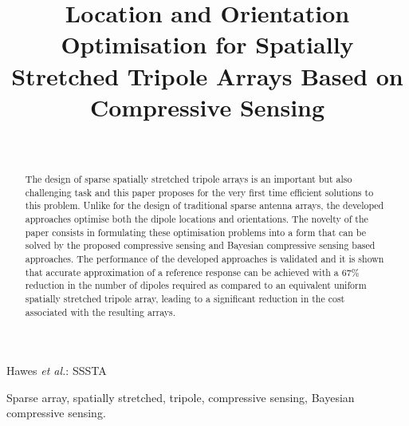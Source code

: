 \documentclass[10pt,final]{IEEEtran}
\begin{document}
%
\title{Location and Orientation Optimisation for Spatially Stretched Tripole Arrays Based on Compressive Sensing}


\author{\\[0.3cm]

}


\maketitle

%
{Hawes \MakeLowercase{\textit{et al.}}: SSSTA}

\begin{abstract}


The design of sparse spatially stretched tripole arrays is an important but also challenging task
and this paper proposes for the very
first time efficient solutions to this problem. Unlike for the
design of traditional sparse antenna arrays, the developed approaches optimise both the dipole locations
and orientations. The novelty of the paper consists in formulating these optimisation problems into a form that
can be solved by the proposed compressive sensing and Bayesian compressive sensing based approaches. The performance of the developed
approaches is validated and it is shown that accurate approximation of a reference response can be
achieved with a 67$\%$ reduction in the number of dipoles required as compared to an equivalent uniform
spatially stretched tripole array, leading to a significant reduction in the cost associated with the resulting arrays.

\end{abstract}
\begin{keywords}
Sparse array, spatially stretched, tripole, compressive sensing, Bayesian compressive sensing.
\end{keywords}
\end{document}
